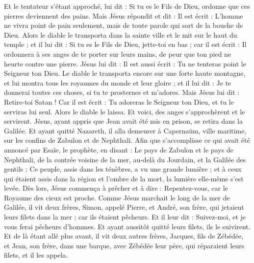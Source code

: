 \begin{multicols}{2}
Et le tentateur s’étant approché, lui dit : Si tu es le Fils de Dieu, ordonne que ces pierres deviennent des pains.
Mais Jésus répondit et dit : Il est écrit : L'homme ne vivra point de pain seulement, mais de toute parole qui sort de la bouche de Dieu{}.
Alors le diable le transporta dans la sainte ville et le mit sur le haut du temple ;
et il lui dit : Si tu es le Fils de Dieu, jette-toi en bas ; car il est écrit : Il ordonnera à ses anges de te porter sur leurs mains, de peur que ton pied ne heurte contre une pierre{}.
Jésus lui dit : Il est aussi écrit : Tu ne tenteras point le Seigneur ton Dieu{}.
Le diable le transporta encore sur une forte haute montagne, et lui montra tous les royaumes du monde et leur gloire ;
et il lui dit : Je te donnerai toutes ces choses, si tu te prosternes et m'adores.
Mais Jésus lui dit : Retire-toi Satan ! Car il est écrit : Tu adoreras le Seigneur ton Dieu, et tu le serviras lui seul{}.
Alors le diable le laissa. Et voici, des anges s'approchèrent et le servirent.
Jésus, ayant appris que Jean avait été mis en prison, se retira dans la Galilée.
Et ayant quitté Nazareth, il alla demeurer à Capernaüm, ville maritime, sur les confins de Zabulon et de Nephthali.
Afin que s’accomplisse ce qui avait été annoncé par Esaïe, le prophète, en disant :
Le pays de Zabulon et le pays de Nephthali, de la contrée voisine de la mer, au-delà du Jourdain, et la Galilée des gentils ;
Ce peuple, assis dans les ténèbres, a vu une grande lumière ; et à ceux qui étaient assis dans la région et l'ombre de la mort, la lumière elle-même s'est levée{}.
Dès lors, Jésus commença à prêcher et à dire : Repentez-vous, car le Royaume des cieux est proche.
Comme Jésus marchait le long de la mer de Galilée, il vit deux frères, Simon, appelé Pierre, et André, son frère, qui jetaient leurs filets dans la mer ; car ils étaient pêcheurs.
Et il leur dit : Suivez-moi, et je vous ferai pêcheurs d'hommes.
Et ayant aussitôt quitté leurs filets, ils le suivirent.
Et de là étant allé plus avant, il vit deux autres frères, Jacques, fils de Zébédée, et Jean, son frère, dans une barque, avec Zébédée leur père, qui réparaient leurs filets, et il les appela.

\end{multicols}

